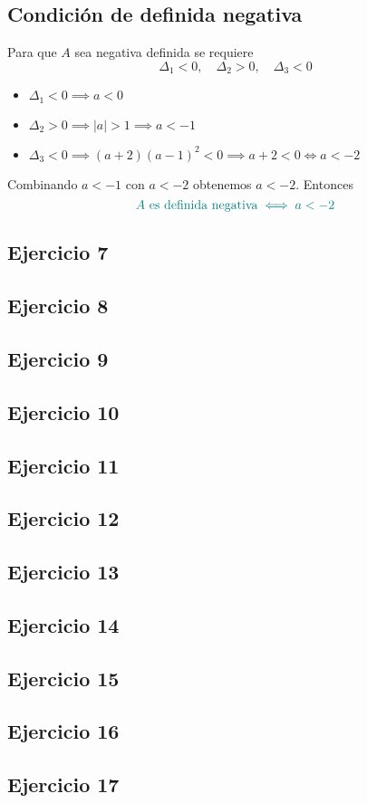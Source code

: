 \documentclass{article}
\begin{document}
\subsection*{Condición de definida negativa}

Para que \(A\) sea negativa definida se requiere
\[
\Delta_1<0,\quad \Delta_2>0,\quad \Delta_3<0
\]
\begin{itemize}
  \item \(\Delta_1<0\implies a<0\)
  \item \(\Delta_2>0\implies |a|>1\implies a<-1\)
  \item \(\Delta_3<0\implies (a+2)(a-1)^2<0\implies a+2<0\iff a<-2\)
\end{itemize}
Combinando \(a<-1\) con \(a<-2\) obtenemos \(a<-2\). Entonces
\[
\color{teal}
A\text{ es definida negativa} \iff a<-2
\]

\newpage

\subsection{Ejercicio 7}
\subsection{Ejercicio 8}
\subsection{Ejercicio 9}
\subsection{Ejercicio 10}
\subsection{Ejercicio 11}
\subsection{Ejercicio 12}
\subsection{Ejercicio 13}
\subsection{Ejercicio 14}
\subsection{Ejercicio 15}
\subsection{Ejercicio 16}
\subsection{Ejercicio 17}
\end{document}
